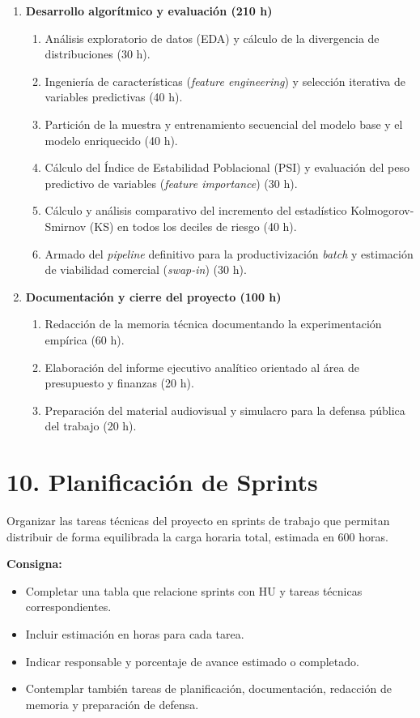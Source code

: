 \documentclass[
11pt, %
codirector, %
]{charter}
\begin{document}
\begin{enumerate}
    \item \textbf{Desarrollo algorítmico y evaluación (210 h)}
    \begin{enumerate}
        \item Análisis exploratorio de datos (EDA) y cálculo de la divergencia de distribuciones (30 h).
        \item Ingeniería de características (\textit{feature engineering}) y selección iterativa de variables predictivas (40 h).
        \item Partición de la muestra y entrenamiento secuencial del modelo base y el modelo enriquecido (40 h).
        \item Cálculo del Índice de Estabilidad Poblacional (PSI) y evaluación del peso predictivo de variables (\textit{feature importance}) (30 h).
        \item Cálculo y análisis comparativo del incremento del estadístico Kolmogorov-Smirnov (KS) en todos los deciles de riesgo (40 h).
        \item Armado del \textit{pipeline} definitivo para la productivización \textit{batch} y estimación de viabilidad comercial (\textit{swap-in}) (30 h).
    \end{enumerate}

    \item \textbf{Documentación y cierre del proyecto (100 h)}
    \begin{enumerate}
        \item Redacción de la memoria técnica documentando la experimentación empírica (60 h).
        \item Elaboración del informe ejecutivo analítico orientado al área de presupuesto y finanzas (20 h).
        \item Preparación del material audiovisual y simulacro para la defensa pública del trabajo (20 h).
    \end{enumerate}

\end{enumerate}

\section{10. Planificación de Sprints}

Organizar las tareas técnicas del proyecto en sprints de trabajo que permitan distribuir de forma equilibrada la carga horaria total, estimada en 600 horas.

\textbf{Consigna:}
\begin{itemize}
  \item Completar una tabla que relacione sprints con HU y tareas técnicas correspondientes.
  \item Incluir estimación en horas para cada tarea.
  \item Indicar responsable y porcentaje de avance estimado o completado.
  \item Contemplar también tareas de planificación, documentación, redacción de memoria y preparación de defensa.
\end{itemize}
\end{document}
